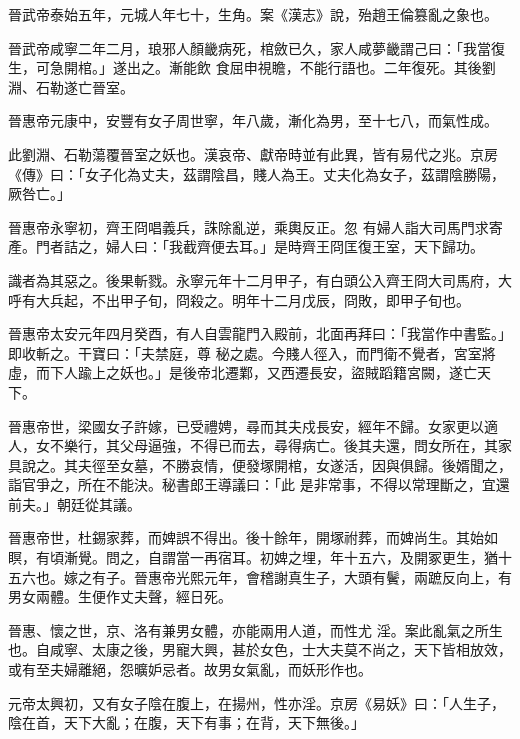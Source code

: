 \begin{pinyinscope}
 晉武帝泰始五年，元城人年七十，生角。案《漢志》說，殆趙王倫篡亂之象也。



 晉武帝咸寧二年二月，琅邪人顏畿病死，棺斂已久，家人咸夢畿謂己曰：「我當復生，可急開棺。」遂出之。漸能飲
 食屈申視瞻，不能行語也。二年復死。其後劉淵、石勒遂亡晉室。



 晉惠帝元康中，安豐有女子周世寧，年八歲，漸化為男，至十七八，而氣性成。



 此劉淵、石勒蕩覆晉室之妖也。漢哀帝、獻帝時並有此異，皆有易代之兆。京房《傳》曰：「女子化為丈夫，茲謂陰昌，賤人為王。丈夫化為女子，茲謂陰勝陽，厥咎亡。」



 晉惠帝永寧初，齊王冏唱義兵，誅除亂逆，乘輿反正。忽
 有婦人詣大司馬門求寄產。門者詰之，婦人曰：「我截齊便去耳。」是時齊王冏匡復王室，天下歸功。



 識者為其惡之。後果斬戮。永寧元年十二月甲子，有白頭公入齊王冏大司馬府，大呼有大兵起，不出甲子旬，冏殺之。明年十二月戊辰，冏敗，即甲子旬也。



 晉惠帝太安元年四月癸酉，有人自雲龍門入殿前，北面再拜曰：「我當作中書監。」即收斬之。干寶曰：「夫禁庭，尊
 秘之處。今賤人徑入，而門衛不覺者，宮室將虛，而下人踰上之妖也。」是後帝北遷鄴，又西遷長安，盜賊蹈籍宮闕，遂亡天下。



 晉惠帝世，梁國女子許嫁，已受禮娉，尋而其夫戍長安，經年不歸。女家更以適人，女不樂行，其父母逼強，不得已而去，尋得病亡。後其夫還，問女所在，其家具說之。其夫徑至女墓，不勝哀情，便發塚開棺，女遂活，因與俱歸。後婿聞之，詣官爭之，所在不能決。秘書郎王導議曰：「此
 是非常事，不得以常理斷之，宜還前夫。」朝廷從其議。



 晉惠帝世，杜錫家葬，而婢誤不得出。後十餘年，開塚祔葬，而婢尚生。其始如瞑，有頃漸覺。問之，自謂當一再宿耳。初婢之埋，年十五六，及開冢更生，猶十五六也。嫁之有子。晉惠帝光熙元年，會稽謝真生子，大頭有鬢，兩蹠反向上，有男女兩體。生便作丈夫聲，經日死。



 晉惠、懷之世，京、洛有兼男女體，亦能兩用人道，而性尤
 淫。案此亂氣之所生也。自咸寧、太康之後，男寵大興，甚於女色，士大夫莫不尚之，天下皆相放效，或有至夫婦離絕，怨曠妒忌者。故男女氣亂，而妖形作也。



 元帝太興初，又有女子陰在腹上，在揚州，性亦淫。京房《易妖》曰：「人生子，陰在首，天下大亂；在腹，天下有事；在背，天下無後。」




\end{pinyinscope}
